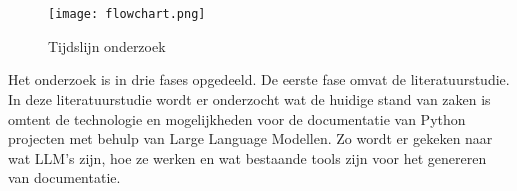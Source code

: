 
\chapter{}%
\label{ch:methodologie}

\begin{figure}[h]
    \centering
    \texttt{[image: flowchart.png]}
    \caption{Tijdslijn onderzoek}
    \label{fig:flowchart}
\end{figure}

Het onderzoek is in drie fases opgedeeld. De eerste fase omvat de literatuurstudie.
In deze literatuurstudie wordt er onderzocht wat de huidige stand van zaken is omtent de technologie en mogelijkheden voor de documentatie van Python projecten met behulp van Large Language Modellen.
Zo wordt er gekeken naar wat LLM's zijn, hoe ze werken en wat bestaande tools zijn voor het genereren van documentatie.

